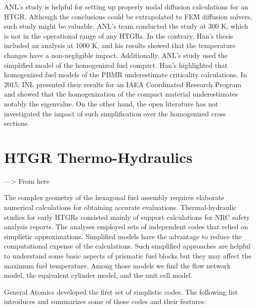 \documentclass[11pt,letterpaper]{article}
\begin{document}
ANL's study is helpful for setting up properly nodal diffusion calculations for an \gls{HTGR}.
Although the conclusions could be extrapolated to \gls{FEM} diffusion solvers, such study might be valuable.
ANL's team conducted the study at 300 K, which is not in the operational range of any \glspl{HTGR}.
In the contrary, Han's thesis included an analysis at 1000 K, and his results showed that the temperature changes have a non-negligible impact.
Additionally, ANL's study used the simplified model of the homogenized fuel compact.
Han's highlighted that homogenized fuel models of the \gls{PBMR} underestimate criticality calculations.
In 2015, \gls{INL} presented their results for an \gls{IAEA} Coordinated Research Program and showed that the homogenization of the compact material underestimates notably the eigenvalue.
On the other hand, the open literature has not investigated the impact of such simplification over the homogenized cross sections.


\section{HTGR Thermo-Hydraulics}

---> From here


The complex geometry of the hexagonal fuel assembly requires elaborate numerical calculations for obtaining accurate evaluations.
Thermal-hydraulic studies for early \glspl{HTGR} consisted mainly of support calculations for \gls{NRC} safety analysis reports.
The analyses employed sets of independent codes that relied on simplistic approximations.
Simplified models have the advantage to reduce the computational expense of the calculations.
Such simplified approaches are helpful to understand some basic aspects of prismatic fuel blocks but they may affect the maximum fuel temperature.
Among those models we find the flow network model, the equivalent cylinder model, and the unit cell model.

General Atomics \cite{shenoy_htgr_1974} developed the first set of simplistic codes.
The following list introduces and summarizes some of those codes and their features:
\end{document}
